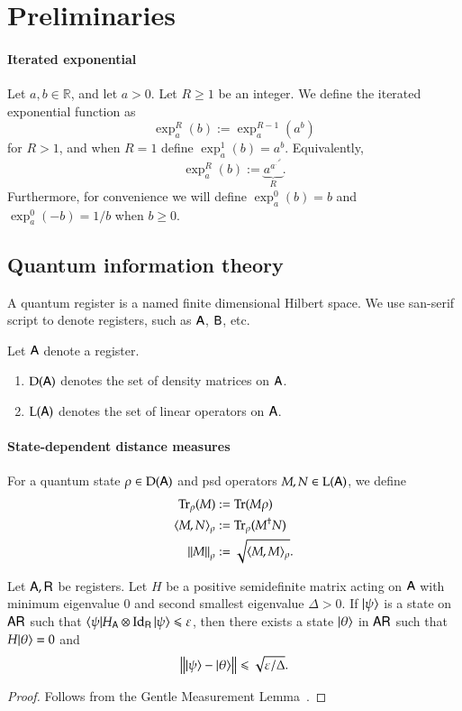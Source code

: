 

\section{Preliminaries}


\paragraph{Iterated exponential}
Let $a,b \in \mathbb{R}$, and let $a > 0$. Let $R \geq 1$ be an integer. We define the iterated exponential function as
\[
	\exp^R_a(b) := \exp^{R-1}_a(a^b)
\]
for $R > 1$, and when $R=1$ define $\exp^1_a(b) = a^b$. Equivalently, 
\[
	\exp^R_a(b) := \underbrace{a^{a^{\cdot^{\cdot^{a^b}}}}}_{R}.
\]
Furthermore, for convenience we will define $\exp^0_a(b) = b$ and $\exp^0_a(-b) = 1/b$ when $b \geq 0$.

\subsection{Quantum information theory}

A quantum register is a named finite dimensional Hilbert space. We use san-serif script to denote registers, such as ${\mathsf{A}}$, ${\mathsf{B}}$, etc. 

Let ${\mathsf{A}}$ denote a register.
\begin{enumerate}
	\item $\mathrm{D}({\mathsf{A}})$ denotes the set of density matrices on ${\mathsf{A}}$.
	\item $\mathrm{L}({\mathsf{A}})$ denotes the set of linear operators on ${\mathsf{A}}$.
\end{enumerate}


\paragraph{State-dependent distance measures}

For a quantum state $\rho \in \mathrm{D}({\mathsf{A}})$ and psd operators $M,N \in \mathrm{L}({\mathsf{A}})$, we define 
\begin{align}
	\operatorname{Tr}_\rho(M) &:= \operatorname{Tr}(M \rho) \\
	\langle M, N \rangle_\rho &:= \operatorname{Tr}_\rho (M^\dagger N) \\
	\left\lVert M \right\rVert_\rho & := \sqrt{ \langle M, M \rangle_\rho}.
\end{align}

\begin{lemma}
\label{lem:closeness_to_groundspace}
	Let ${\mathsf{A}}, {\mathsf{R}}$ be registers. Let $H$ be a positive semidefinite matrix acting on ${\mathsf{A}}$ with minimum eigenvalue $0$ and second smallest eigenvalue $\Delta > 0$. If $|\psi\rangle$ is a state on ${\mathsf{A}} {\mathsf{R}}$ such that $\langle\psi| H_{{\mathsf{A}}} \otimes \mathop{\mathrm{Id}}\!\mathinner{}_{{\mathsf{R}}} |\psi\rangle \leqslant \varepsilon$, then there exists a state $|\theta\rangle$ in ${\mathsf{A}} {\mathsf{R}}$ such that $H |\theta\rangle = 0$ and
	\[
		\left \| |\psi\rangle - |\theta\rangle \right \| \leqslant \sqrt{\varepsilon/\Delta}.
	\]
\end{lemma}
\begin{proof}
	Follows from the Gentle Measurement Lemma~\cite{ogawa2002new}.
\end{proof}

